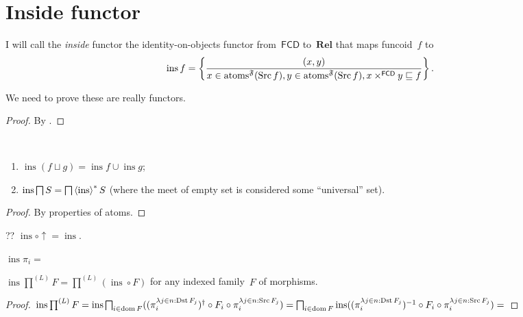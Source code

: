 \chapter{Inside functor}

\begin{defn}
I will call the \emph{inside} functor the identity-on-objects functor from~$\mathsf{FCD}$ to~$\mathbf{Rel}$ that maps
funcoid~$f$ to
\[
\operatorname{ins} f =
\left\{ \frac{(x,y)}{x\in\operatorname{atoms}^{\mathfrak{F}}(\operatorname{Src} f), y\in\operatorname{atoms}^{\mathfrak{F}}(\operatorname{Src} f), x\times^{\mathsf{FCD}}y\sqsubseteq f}\right\}. \]
\end{defn}

We need to prove these are really functors.

\begin{proof}
By \cite[proposition~]{volume-1}.
\end{proof}

\begin{prop}
~
\begin{enumerate}
\item $\operatorname{ins}(f\sqcup g)=\operatorname{ins}f\cup\operatorname{ins}g$;
\item $\operatorname{ins}\bigsqcap S=\bigsqcap\left\langle \operatorname{ins}\right\rangle ^{\ast}S$ (where the meet of empty set is considered some ``universal'' set).
\end{enumerate}
\end{prop}

\begin{proof}
By properties of atoms.
\end{proof}

\begin{prop}
?? $\operatorname{ins}\circ\uparrow = \operatorname{ins}$.
\end{prop}

\begin{prop}
$\operatorname{ins}\pi_i=$
\end{prop}


\begin{prop}
$\operatorname{ins}\prod^{(L)}F =
\prod^{(L)}(\operatorname{ins}\circ F)$ for any indexed family~$F$ of morphisms.
\end{prop}

\begin{proof}
$\operatorname{ins}\prod^{(L)}F =
\operatorname{ins}\bigsqcap_{i \in \operatorname{dom} F} ((\pi^{\lambda j \in n :
\operatorname{Dst} F_j}_i)^{\dagger} \circ F_i \circ \pi^{\lambda j \in n :
\operatorname{Src} F_j}_i) =
\bigsqcap_{i \in \operatorname{dom} F}\operatorname{ins} ((\pi^{\lambda j \in n :
\operatorname{Dst} F_j}_i)^{-1} \circ F_i \circ \pi^{\lambda j \in n :
\operatorname{Src} F_j}_i) =
$
\end{proof}